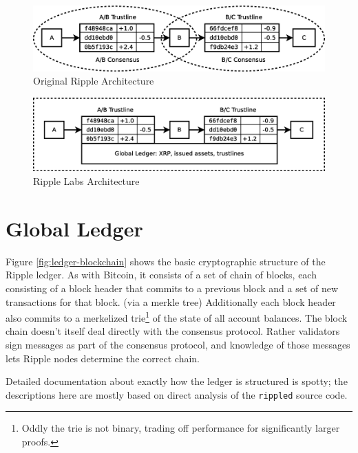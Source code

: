 \documentclass{article}
\begin{document}
\begin{figure}
    \centering
    \includegraphics[scale=0.35]{figures/orig-ripple.eps}
    \caption{Original Ripple Architecture}
    \label{fig:orig-ripple}
\end{figure}

\begin{figure}
    \centering
    \includegraphics[scale=0.35]{figures/ripple-labs-ripple.eps}
    \caption{Ripple Labs Architecture}
    \label{fig:ripple-labs-ripple}
\end{figure}


\section{Global Ledger}

Figure \ref{fig:ledger-blockchain} shows the basic cryptographic structure of
the Ripple ledger. As with Bitcoin, it consists of a set of chain of blocks,
each consisting of a block header that commits to a previous block and a set of
new transactions for that block. (via a merkle tree) Additionally each block
header also commits to a merkelized trie\footnote{Oddly the trie is not binary,
trading off performance for significantly larger proofs.} of the state of all
account balances. The block chain doesn't itself deal directly with the
consensus protocol. Rather validators sign messages as part of the consensus
protocol, and knowledge of those messages lets Ripple nodes determine the
correct chain.

Detailed documentation about exactly how the ledger is structured is spotty;
the descriptions here are mostly based on direct analysis of the
\texttt{rippled} source code.
\end{document}
